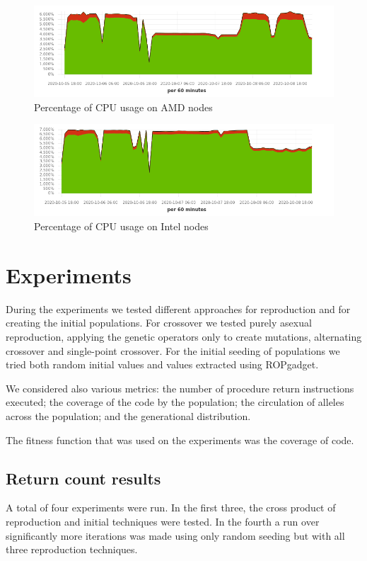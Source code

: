 \documentclass{article}
\begin{document}
\begin{figure}[ht]
\centering
\includegraphics[width=\textwidth]{g1}
\caption{Percentage of CPU usage on AMD nodes}
\label{fig:g1}
\end{figure}
\begin{figure}[ht]
\centering
\includegraphics[width=\textwidth]{g2}
\caption{Percentage of CPU usage on Intel nodes}
\label{fig:g2}
\end{figure}

\section{Experiments}
During the experiments we tested different approaches for reproduction and for creating the initial populations. For crossover we tested purely asexual reproduction, applying the genetic operators only to create mutations, alternating crossover and single-point crossover. For the initial seeding of populations we tried both random initial values and values extracted using ROPgadget.

We considered also various metrics: the number of procedure return instructions executed; the coverage of the code by the population; the circulation of alleles across the population; and the generational distribution.

The fitness function that was used on the experiments was the coverage of code.


\subsection{Return count results}
A total of four experiments were run. In the first three, the cross product of reproduction and initial techniques were tested. In the fourth a run over significantly more iterations was made using only random seeding but with all three reproduction techniques.
\end{document}
